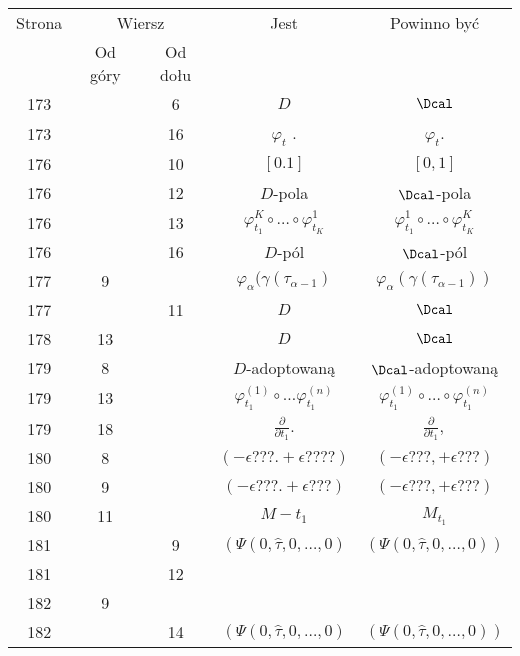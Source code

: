 \documentclass[a4paper,11pt]{article}
\numberwithin{equation}{section}
\begin{document}
\begin{center}
  \begin{tabular}{|c|c|c|c|c|}
    \hline
    Strona & \multicolumn{2}{c|}{Wiersz} & Jest
                              & Powinno być \\ \cline{2-3}
    & Od góry & Od dołu & & \\
    \hline
    173 & & \hphantom{0}6 & $D$ & $\Dcal$ \\
    173 & & 16 & $\varphi_{ t }$ . & $\varphi_{ t }$. \\
    176 & & 10 & $[ 0. 1 ]$ & $[ 0, 1 ]$ \\
    176 & & 12 & $D$-pola & $\Dcal$-pola \\
    176 & & 13 & $\varphi_{ t_{ 1 } }^{ K } \circ \ldots \circ \varphi_{ t_{ K } }^{ 1 }$
           & $\varphi_{ t_{ 1 } }^{ 1 } \circ \ldots \circ \varphi_{ t_{ K } }^{ K }$ \\
    176 & & 16 & $D$-pól & $\Dcal$-pól \\
    177 & \hphantom{0}9 & & $\varphi_{ \alpha }( \gamma ( \tau_{ \alpha - 1 } )$
           & $\varphi_{ \alpha }( \gamma ( \tau_{ \alpha - 1 } ) )$ \\
    177 & & 11 & $D$ & $\Dcal$ \\
    178 & 13 & & $D$ & $\Dcal$ \\
    179 & \hphantom{0}8 & & $D$-adoptowaną & $\Dcal$-adoptowaną \\
    179 & 13 & & $\varphi_{ t_{ 1 } }^{ ( 1 ) } \circ \ldots \varphi_{ t_{ 1 } }^{ ( n ) }$
           & $\varphi_{ t_{ 1 } }^{ ( 1 ) } \circ \ldots \circ \varphi_{ t_{ 1 } }^{ ( n ) }$
    \\
    179 & 18 & & $\frac{ \partial }{ \partial t_{ 1 } }.$
           & $\frac{ \partial }{ \partial t_{ 1 } },$ \\
    180 & \hphantom{0}8 & & $( -\epsilon???. +\epsilon???? )$ & $( -\epsilon???, +\epsilon??? )$ \\
    180 & \hphantom{0}9 & & $( -\epsilon???. +\epsilon??? )$ & $( -\epsilon???, +\epsilon??? )$ \\
    180 & 11 & & $M - t_{ 1 }$ & $M_{ t_{ 1 } }$ \\
    181 & & \hphantom{0}9 & $\left( \Psi( 0, \hat{ \tau }, 0, \ldots, 0) \right.$
           & $\left( \Psi( 0, \hat{ \tau }, 0, \ldots, 0) \right)$ \\
    181 & & 12 & & \\
    182 & \hphantom{0}9 & & & \\
    182 & & 14 & $\left( \Psi( 0, \hat{ \tau }, 0, \ldots, 0) \right.$
           & $\left( \Psi( 0, \hat{ \tau }, 0, \ldots, 0) \right)$ \\

\end{tabular}
\end{center}
\end{document}
